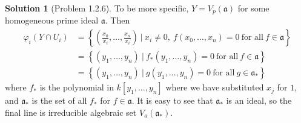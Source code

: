 \documentclass[aps,pra,showpacs,notitlepage,onecolumn,superscriptaddress,nofootinbib]{revtex4-1}
\theoremstyle{definition}
\newtheorem{solution}{Solution}[section]
\begin{document}
\begin{solution}[Problem 1.2.6]
  To be more specific, $Y = V_p(\mathfrak{a})$ for some homogeneous prime ideal $\mathfrak{a}$. Then
  \begin{align}
    \varphi_i(Y \cap U_i) &= \left\{ \left( \frac{x_0}{x_i}, \dots, \frac{x_n}{x_i} \right) \ \Big| \ x_i \neq 0, \ f(x_0, \dots, x_n) = 0 \ \text{for all} \ f \in \mathfrak{a} \right\}
    \\ &= \left\{ (y_1, \dots, y_n) \ | \ f_{*}(y_1, \dots, y_n) = 0 \ \text{for all} \ f \in \mathfrak{a} \right\}
    \\ &= \left\{ (y_1, \dots, y_n) \ | \ g(y_1, \dots, y_n) = 0 \ \text{for all} \ g \in \mathfrak{a}_{*} \right\}
    \end{align}
  where $f_{*}$ is the polynomial in $k[y_1, \dots, y_n]$ where we have substituted $x_j$ for $1$, and $\mathfrak{a}_{*}$ is the set of all $f_{*}$ for $f \in \mathfrak{a}$.
  It is easy to see that $\mathfrak{a}_{*}$ is an ideal, so the final line is irreducible algebraic set $V_a(\mathfrak{a}_{*})$.


\end{solution}
\end{document}

